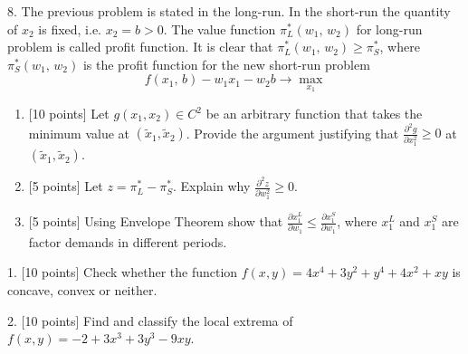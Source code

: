 \documentclass[12pt,a4paper]{article}
\begin{document}
8. The previous problem is stated in the long-run. In the short-run the quantity of ${x_2}$ is fixed, i.e. ${x_2} = b > 0$. The value function $\pi _L^*({w_1},\,{w_2})$ for long-run problem is called profit function. It is clear that $\pi_L^*({w_1},\,{w_2}) \geqslant \pi _S^*$, where $\pi_S^*({w_1},\,{w_2})$  is the profit function for the new short-run problem
\[
f({x_1},\,b) - {w_1}{x_1} - {w_2}b \to \max_{x_1}
\]
\begin{enumerate}
  \item {[10 points]} Let $g({x_1}, {x_2}) \in {C^2}$ be an arbitrary function that takes the minimum value at $({\tilde x_1}, {\tilde x_2})$. Provide the argument justifying that $\frac{{{\partial ^2}g}}{{\partial x_1^2}} \geqslant 0$ at $({\tilde x_1}, {\tilde x_2})$.
  \item {[5 points]} Let $z = \pi _L^* - \pi _S^*$. Explain why $\frac{{{\partial ^2}z}}{{\partial w_1^2}} \geqslant 0$.
  \item {[5 points]} Using Envelope Theorem show that $\frac{{\partial x_1^L}}{{\partial {w_1}}} \leqslant \frac{{\partial x_1^S}}{{\partial {w_1}}}$, where $x_1^L$ and $x_1^S$ are factor demands in different periods.
\end{enumerate}







\newpage
{}
\setcounter{page}{1}


1. {[10 points]} Check whether the function $f(x,y)= 4x^4 + 3y^2+y^4+4x^2+xy$ is concave, convex or neither.

\newpage
{}

2. {[10 points]} Find and classify the local extrema of $f(x,y) = -2 + 3x^3 + 3y^3 - 9xy$.

\newpage
{}
\end{document}
